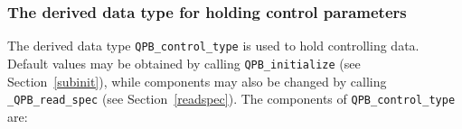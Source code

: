 \documentclass{galahad}
\newcommand{\packagename}{QPB}
\newcommand{\fullpackagename}{\libraryname\_\packagename}
\begin{document}

\subsubsection{The derived data type for holding control 
 parameters}\label{typecontrol}
The derived data type 
{\tt \packagename\_control\_type} 
is used to hold controlling data. Default values may be obtained by calling 
{\tt \packagename\_initialize}
(see Section~\ref{subinit}),
while components may also be changed by calling 
{\tt \fullpackagename\_read\-\_spec}
(see Section~\ref{readspec}). 
The components of 
{\tt \packagename\_control\_type} 
are:



\end{document}
